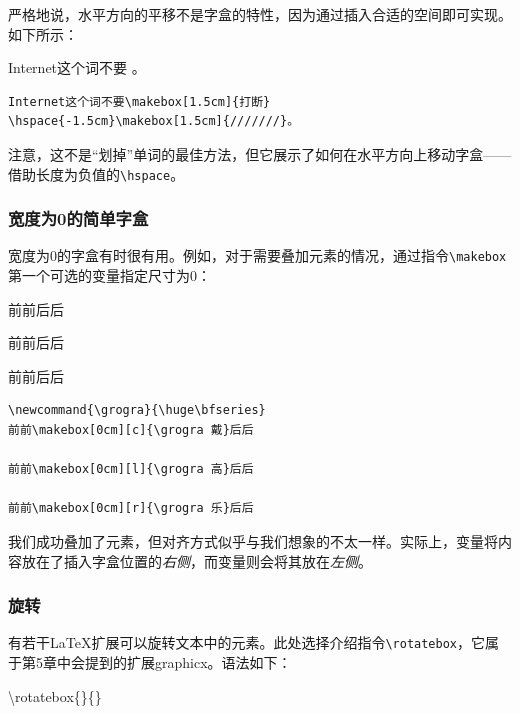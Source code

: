 严格地说，水平方向的平移不是字盒的特性，因为通过插入合适的空间即可实现。如下所示：

\begin{codelist}[4.13]{
  Internet这个词不要
\hspace{-1.5cm}\makebox[1.5cm]{///////}。
}\begin{verbatim}
Internet这个词不要\makebox[1.5cm]{打断}
\hspace{-1.5cm}\makebox[1.5cm]{///////}。
\end{verbatim}
\end{codelist}

注意，这不是“划掉”单词的最佳方法，但它展示了如何在水平方向上移动字盒——借助长度为负值的\verb|\hspace|。

\subsubsection{宽度为0的简单字盒}

宽度为0的字盒有时很有用。例如，对于需要叠加元素的情况，通过指令\verb|\makebox|第一个可选的变量指定尺寸为0：

\begin{codelist}[4.14]{
  \newcommand{\grogra}{\huge\bfseries}
前前\makebox[0cm][c]{\grogra 戴}后后

前前\makebox[0cm][l]{\grogra 高}后后

前前\makebox[0cm][r]{\grogra 乐}后后
}\begin{verbatim}
\newcommand{\grogra}{\huge\bfseries}
前前\makebox[0cm][c]{\grogra 戴}后后

前前\makebox[0cm][l]{\grogra 高}后后

前前\makebox[0cm][r]{\grogra 乐}后后
\end{verbatim}
\end{codelist}

我们成功叠加了元素，但对齐方式似乎与我们想象的不太一样。实际上，变量将内容放在了插入字盒位置的\emph{右侧}，而变量则会将其放在\emph{左侧}。

\subsubsection{旋转}

有若干\LaTeX 扩展可以旋转文本中的元素。此处选择介绍指令\verb|\rotatebox|，它属于第5章中会提到的扩展\textsf{graphicx}。语法如下：

\begin{dmd}
\backslash rotatebox\{\}\{\}
\end{dmd}

